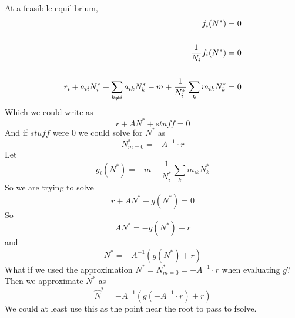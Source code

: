 \documentclass{article}
\begin{document}
At a feasibile equilibrium,
\begin{align}
f_i(N^*) &= 0 \notag \\
\notag \\
\dfrac{1}{N_i}f_i(N^*) &= 0 \notag \\
\notag \\
r_i + a_{ii}N_i^* + \sum_{k\neq i} a_{ik}N_k^* - m + \dfrac{1}{N_i^*}\sum_k m_{ik} N_k^* &= 0 
\end{align}
Which we could write as
\begin{equation}
r + AN^* + stuff = 0
\end{equation}
And if $stuff$ were 0 we could solve for $N^*$ as
\begin{equation}
N^*_{m=0} = -A^{-1} \cdot r
\end{equation}
Let
\begin{equation} 
g_i(N^*) = - m + \dfrac{1}{N_i^*}\sum_k m_{ik} N_k^*
\end{equation}
So we are trying to solve
\begin{equation} 
r + AN^* + g(N^*) = 0 
\end{equation}
So
\begin{equation} 
AN^* = -g(N^*) -r
\end{equation}
and
\begin{equation} 
N^* = -A^{-1}\left(g(N^*) +r\right)
\end{equation}
What if we used the approximation $N^* = N^*_{m=0}=-A^{-1} \cdot r$ when evaluating $g$?
Then we approximate $N^*$ as
\begin{equation} 
    \hat N^* = -A^{-1}\left(g(-A^{-1} \cdot r) +r\right)
\end{equation}
We could at least use this as the point near the root to pass to fsolve.
\end{document}
